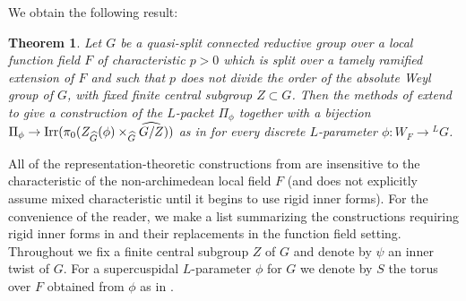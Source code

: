 \documentclass{amsart}
\newtheorem{theorem}[result]{Theorem}
\theoremstyle{definition}
\theoremstyle{remark}
\begin{document}
We obtain the following result:

\begin{theorem}\label{thm:scuspidal}
    Let $G$ be a quasi-split connected reductive group over a local function field $F$ of characteristic $p>0$ which is split over a tamely ramified extension of $F$ and such that $p$ does not divide the order of the absolute Weyl group of $G$, with fixed finite central subgroup $Z \subset G$. Then the methods of \cite{Kal22} extend to give a construction of the $L$-packet $\Pi_{\phi}$ together with a bijection $\Pi_{\phi} 
    \to \textnormal{Irr}(\pi_{0}(Z_{\widehat{G}}(\phi) \times_{\widehat{G}} \widehat{G/Z}))$ as in \cite[(4.8)]{Kal22} for every discrete $L$-parameter $\phi \colon W_{F} \to {^{L}G}$. 
\end{theorem}

All of the representation-theoretic constructions from \cite{Kal22} are insensitive to the characteristic of the non-archimedean local field $F$ (and \cite{Kal22} does not explicitly assume mixed characteristic until it begins to use rigid inner forms). For the convenience of the reader, we make a list summarizing the constructions requiring rigid inner forms in \cite{Kal22} and their replacements in the function field setting. Throughout we fix a finite central subgroup $Z$ of $G$ and denote by $\psi$ an inner twist of $G$. For a supercuspidal $L$-parameter $\phi$ for $G$ we denote by $S$ the torus over $F$ obtained from $\phi$ as in \cite[\S 4.1]{Kal22}.
\end{document}
